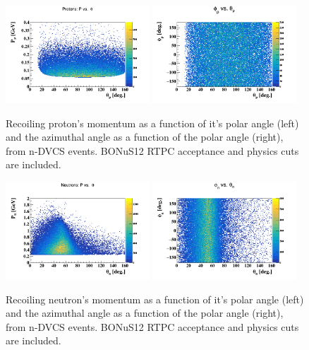 \begin{figure}[htb]
\centering
   \includegraphics[width=0.48\textwidth,clip,trim=0mm 0mm 0mm 
   20mm]{figs/p_p_theta.png}
\includegraphics[width=0.48\textwidth,clip,trim=0mm 0mm 0mm 
   20mm]{figs/p_phi_theta.png}
   \caption{Recoiling proton's momentum as a function of it's polar angle 
   (left) and the azimuthal angle as a function of the polar angle (right), 
   from n-DVCS events. BONuS12 RTPC acceptance and physics cuts are included.}
   \label{fig:photon_kin}
\end{figure}
 
\begin{figure}[htb]
\centering
   \includegraphics[width=0.48\textwidth,clip,trim=0mm 0mm 0mm 
   20mm]{figs/n_p_theta.png}
\includegraphics[width=0.48\textwidth,clip,trim=0mm 0mm 0mm 
   20mm]{figs/n_phi_theta.png}
   \caption{Recoiling neutron's momentum as a function of it's polar angle 
   (left) and the azimuthal angle as a function of the polar angle (right), 
   from n-DVCS events. BONuS12 RTPC acceptance and physics cuts are included.}
   \label{fig:photon_kin}
\end{figure}
 

